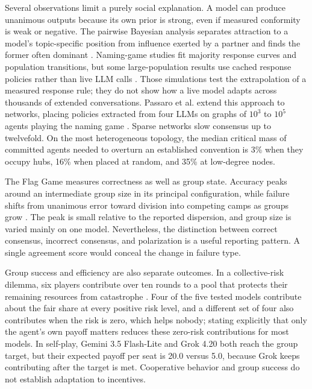 Several observations limit a purely social explanation. A model can produce unanimous outputs because its own prior is strong, even if measured conformity is weak or negative. The pairwise Bayesian analysis separates attraction to a model's topic-specific position from influence exerted by a partner and finds the former often dominant \citep{brockers-opinion-dynamics}. Naming-game studies fit majority response curves and population transitions, but some large-population results use cached response policies rather than live LLM calls \citep{prev-demarzo-majority,prev-flint-group-size,indirect-tipping}. Those simulations test the extrapolation of a measured response rule; they do not show how a live model adapts across thousands of extended conversations. Passaro et al. extend this approach to networks, placing policies extracted from four LLMs on graphs of $10^3$ to $10^5$ agents playing the naming game \citep{network-topology-consensus}. Sparse networks slow consensus up to twelvefold. On the most heterogeneous topology, the median critical mass of committed agents needed to overturn an established convention is 3\% when they occupy hubs, 16\% when placed at random, and 35\% at low-degree nodes.

The Flag Game measures correctness as well as group state. Accuracy peaks around an intermediate group size in its principal configuration, while failure shifts from unanimous error toward division into competing camps as groups grow \citep{flag-game}. The peak is small relative to the reported dispersion, and group size is varied mainly on one model. Nevertheless, the distinction between correct consensus, incorrect consensus, and polarization is a useful reporting pattern. A single agreement score would conceal the change in failure type.

Group success and efficiency are also separate outcomes. In a collective-risk dilemma, six players contribute over ten rounds to a pool that protects their remaining resources from catastrophe \citep{cooperation-without-adaptation}. Four of the five tested models contribute about the fair share at every positive risk level, and a different set of four also contributes when the risk is zero, which helps nobody; stating explicitly that only the agent's own payoff matters reduces these zero-risk contributions for most models. In self-play, Gemini 3.5 Flash-Lite and Grok 4.20 both reach the group target, but their expected payoff per seat is 20.0 versus 5.0, because Grok keeps contributing after the target is met. Cooperative behavior and group success do not establish adaptation to incentives.


